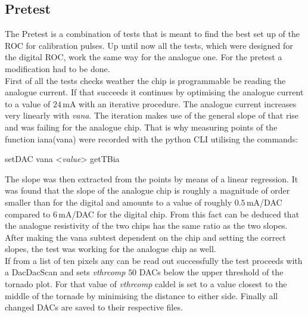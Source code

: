 \subsection{Pretest}
The Pretest is a combination of tests that is meant to find the best set up of the \ac{ROC} for calibration pulses. Up until now all the tests, which were designed for the digital \ac{ROC}, work the same way for the analogue one. For the pretest a modification had to be done.\\
First of all the tests checks weather the chip is programmable be reading the analogue current. If that succeeds it continues by optimising the analogue current to a value of $24\,$mA with an iterative procedure. The analogue current increases very linearly with \textit{vana}. The iteration makes use of the general slope of that rise and was failing for the analogue chip. That is why measuring points of the function iana(vana) were recorded with the python \ac{CLI} utilising the commands:
\begin{itemize}\ubuntu
	\tri setDAC vana <\textit{value}>
	\tri getTBia
\end{itemize}
The slope was then extracted from the points by means of a linear regression. It was found that the slope of the analogue chip is roughly a magnitude of order smaller than for the digital and amounts to a value of roughly $0.5\,$mA/DAC compared to $6\,$mA/DAC for the digital chip. From this fact can be deduced that the analogue resistivity of the two chips has the same ratio as the two slopes. After making the vana subtest dependent on the chip and setting the correct slopes, the test was working for the analogue chip as well.\\
If from a list of ten pixels any can be read out successfully the test proceeds with a DacDacScan and sets \textit{vthrcomp} $50$ \ac{DAC}s below the upper threshold of the tornado plot. For that value of \textit{vthrcomp} caldel is set to a value closest to the middle of the tornade by minimising the distance to either side. Finally all changed \ac{DAC}s are saved to their respective files. 
